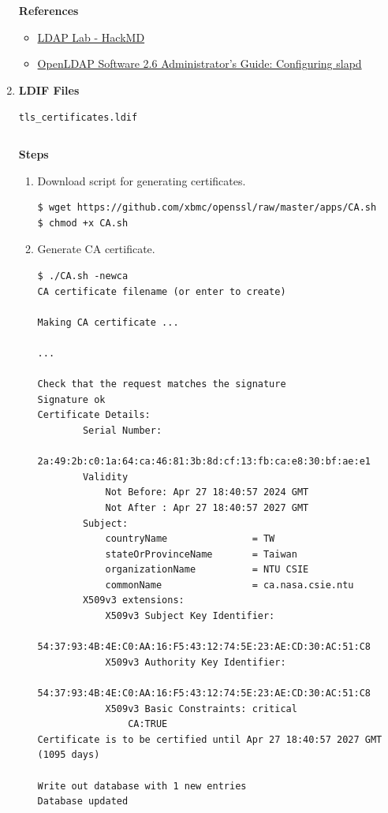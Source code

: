 \documentclass[12pt, a4paper]{article}
\begin{document}
\begin{enumerate}[label=(\alph*)]
    \textbf{References}
    \begin{itemize}
      \item \href{https://hackmd.io/@Mqvhsb9VRYSU2scAkRqGIQ/SJUufUTC6}{LDAP Lab - HackMD}
      \item \href{https://www.openldap.org/doc/admin26/slapdconf2.html}{OpenLDAP Software 2.6 Administrator's Guide: Configuring slapd}
    \end{itemize}

    \pagebreak
    \item \textbf{LDIF Files}

    \verb|tls_certificates.ldif|
    \inputminted{ldif}{ldif/tls_certificates.ldif}

    \textbf{Steps}
    \begin{enumerate}[label=(\arabic*)]
      \item Download script for generating certificates.
      \begin{Verbatim}[frame=single]
$ wget https://github.com/xbmc/openssl/raw/master/apps/CA.sh
$ chmod +x CA.sh
      \end{Verbatim}
      \item Generate CA certificate.
      \begin{Verbatim}[frame=single, fontsize=\footnotesize]
$ ./CA.sh -newca
CA certificate filename (or enter to create)

Making CA certificate ...

...

Check that the request matches the signature
Signature ok
Certificate Details:
        Serial Number:
            2a:49:2b:c0:1a:64:ca:46:81:3b:8d:cf:13:fb:ca:e8:30:bf:ae:e1
        Validity
            Not Before: Apr 27 18:40:57 2024 GMT
            Not After : Apr 27 18:40:57 2027 GMT
        Subject:
            countryName               = TW
            stateOrProvinceName       = Taiwan
            organizationName          = NTU CSIE
            commonName                = ca.nasa.csie.ntu
        X509v3 extensions:
            X509v3 Subject Key Identifier:
                54:37:93:4B:4E:C0:AA:16:F5:43:12:74:5E:23:AE:CD:30:AC:51:C8
            X509v3 Authority Key Identifier:
                54:37:93:4B:4E:C0:AA:16:F5:43:12:74:5E:23:AE:CD:30:AC:51:C8
            X509v3 Basic Constraints: critical
                CA:TRUE
Certificate is to be certified until Apr 27 18:40:57 2027 GMT (1095 days)

Write out database with 1 new entries
Database updated
      \end{Verbatim}


\end{enumerate}
\end{enumerate}
\end{document}
